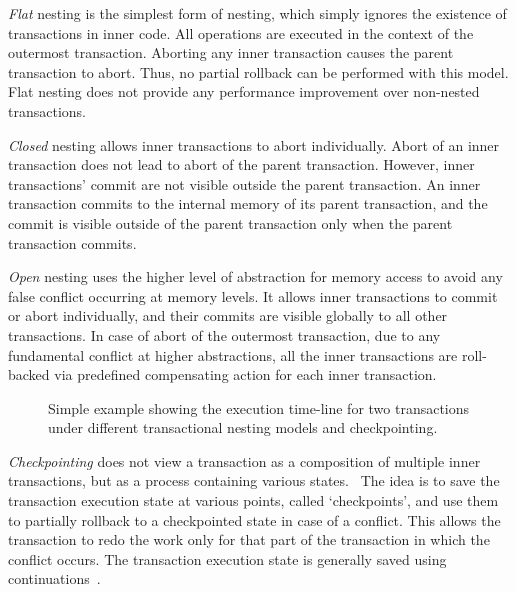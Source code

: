 \documentclass[12pt,english]{report}
\begin{document}
\textit{Flat} nesting is the simplest form of nesting, which simply ignores the existence of transactions in inner code. All operations are executed in the context of the outermost transaction. Aborting any inner transaction causes the parent transaction to abort. Thus, no partial rollback can be performed with this model. Flat nesting does not provide any performance improvement over non-nested transactions.

\textit{Closed} nesting allows inner transactions to abort individually. Abort of an inner transaction does not lead to abort of the parent transaction. However, inner transactions' commit are not visible outside the parent transaction. An inner transaction commits to the internal memory of its parent transaction, and the commit is visible outside of the parent transaction only when the parent transaction commits. 

\textit{Open} nesting uses the higher level of abstraction for memory access to avoid any false conflict  occurring at memory levels. It allows inner transactions to commit or abort individually, and their commits are visible globally to all other transactions. In case of abort of the outermost transaction, due to any fundamental conflict at higher abstractions, all the inner transactions are roll-backed via predefined compensating action for each inner transaction.

\begin{figure}
\caption{Simple example showing the execution time-line for two transactions under different transactional nesting models and checkpointing.}
\label{Fig:Nesting_example}
\end{figure}

\textit{Checkpointing} does not view a transaction as a composition of multiple inner transactions, but as a process containing various states.~\cite{Checkpointing:1702129} 
The idea is to save the transaction execution state at various points, called `checkpoints', and use them to partially rollback to a checkpointed state in case of a conflict. This allows the transaction to redo the work only for that part of the transaction in which the conflict occurs. The transaction execution state is generally saved using continuations~\cite{flanagan1993essence}. 
\end{document}
